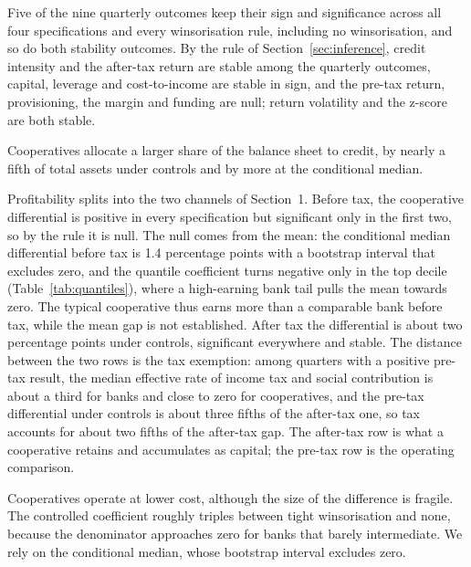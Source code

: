 \documentclass[11pt,a4paper]{article}
\begin{document}
\begin{table}[htbp]
\centering
\begin{threeparttable}
\caption{Cooperative differential against banks}
\label{tab:main}

\end{threeparttable}
\end{table}

Five of the nine quarterly outcomes keep their sign and significance across all four
specifications and every winsorisation rule, including no winsorisation, and so do both
stability outcomes. By the rule of
Section~\ref{sec:inference}, credit intensity and the after-tax return are stable among
the quarterly outcomes, capital, leverage and cost-to-income are stable in sign, and the
pre-tax return, provisioning, the margin and funding are null; return volatility and the
z-score are both stable.

Cooperatives allocate a larger share of the balance sheet to credit, by nearly a fifth of
total assets under controls and by more at the conditional median.

Profitability splits into the two channels of Section~1. Before tax, the cooperative
differential is positive in every specification but significant only in the first two,
so by the rule it is null. The null comes from the mean: the conditional median
differential before tax is 1.4 percentage points with a bootstrap interval that excludes
zero, and the quantile coefficient turns negative only in the top decile
(Table~\ref{tab:quantiles}), where a high-earning bank tail pulls the mean towards zero.
The typical cooperative thus earns more than a comparable bank before tax, while the
mean gap is not established. After
tax the differential is about two percentage
points under controls, significant everywhere and stable. The distance between the two
rows is the tax exemption: among quarters with a positive pre-tax result, the median
effective rate of income tax and social contribution is about a third for banks and
close to zero for cooperatives, and the pre-tax differential under controls is about
three fifths of the after-tax one, so tax accounts for about two fifths of the after-tax
gap. The after-tax row is what a cooperative retains and accumulates as capital; the
pre-tax row is the operating comparison.

Cooperatives operate at lower cost, although the size of the difference is fragile. The
controlled coefficient roughly triples between tight winsorisation and none, because the
denominator approaches zero for banks that barely intermediate. We rely on the
conditional median, whose bootstrap interval excludes zero.
\end{document}
